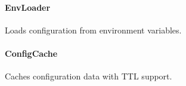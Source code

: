 \hypertarget{envloader}{%
\paragraph{EnvLoader}\label{envloader}}

Loads configuration from environment variables.

\begin{Shaded}
\begin{Highlighting}[]
\OperatorTok{\textless{}}\OperatorTok{\textgreater{}} \OperatorTok{\textless{}}\OperatorTok{\textgreater{}}\NormalTok{ \{}
  \NormalTok{(}
\OperatorTok{:}\OperatorTok{,}
\OperatorTok{:} \OperatorTok{,}
\NormalTok{  )}\OperatorTok{;}
  
  \NormalTok{()}\OperatorTok{:} \OperatorTok{\textless{}}\OperatorTok{\textgreater{};}
   \NormalTok{()}\OperatorTok{:} \OperatorTok{;}
\NormalTok{\}}
\end{Highlighting}
\end{Shaded}

\hypertarget{configcache}{%
\paragraph{ConfigCache}\label{configcache}}

Caches configuration data with TTL support.

